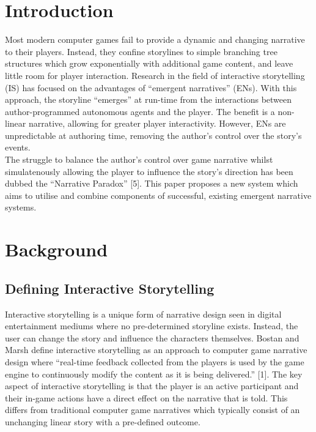 \documentclass{sig-alternate-05-2015}
\begin{document}


\section{Introduction}
Most modern computer games fail to provide a dynamic and changing narrative to their players. Instead, they confine storylines to simple branching tree structures which grow exponentially with additional game content, and leave little room for player interaction. Research in the field of interactive storytelling (IS) has focused on the advantages of ``emergent narratives'' (ENs). With this approach, the storyline ``emerges'' at run-time from the interactions between author-programmed autonomous agents and the player. The benefit is a non-linear narrative, allowing for greater player interactivity. However, ENs are unpredictable at authoring time, removing the author's control over the story's events.\\

\noindent The struggle to balance the author's control over game narrative whilst simulatenously allowing the player to influence the story's direction has been dubbed the ``Narrative Paradox'' [5]. This paper proposes a new system which aims to utilise and combine components of successful, existing emergent narrative systems.

\section{Background}

\subsection{Defining Interactive Storytelling}

Interactive storytelling is a unique form of narrative design seen in digital entertainment mediums where no pre-determined storyline exists. Instead, the user can change the story and influence the characters themselves. Bostan and Marsh define interactive storytelling as an approach to computer game narrative design where ``real-time feedback collected from the players is used by the game engine to continuously modify the content as it is being delivered.'' [1]. The key aspect of interactive storytelling is that the player is an active participant and their in-game actions have a direct effect on the narrative that is told. This differs from traditional computer game narratives which typically consist of an unchanging linear story with a pre-defined outcome.
\end{document}
